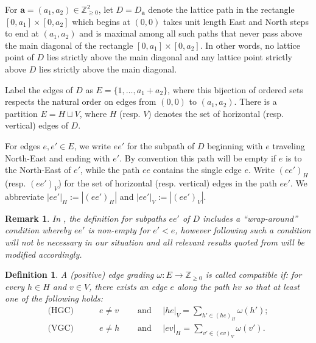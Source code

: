 \documentclass{amsart}
\newtheorem{definition}[theorem]{Definition}
\newtheorem{remark}[theorem]{Remark}
\newcommand{\bfa}{\mathbf{a}}
\newcommand{\ZZ}{\mathbb{Z}}
\begin{document}
For $\bfa=(a_1,a_2)\in\ZZ_{\ge0}^2$, let $D=D_\bfa$ denote the lattice path in the rectangle $[0,a_1]\times[0,a_2]$ which begins at $(0,0)$ takes unit length East and North steps to end at $(a_1,a_2)$ and is maximal among all such paths that never pass above the main diagonal of the rectangle $[0,a_1]\times[0,a_2]$.  In other words, no lattice point of $D$ lies strictly above the main diagonal and any lattice point strictly above $D$ lies strictly above the main diagonal.

Label the edges of $D$ as $E=\{1,\ldots,a_1+a_2\}$, where this bijection of ordered sets respects the natural order on edges from $(0,0)$ to $(a_1,a_2)$.  There is a partition $E=H\sqcup V$, where $H$ (resp. $V$) denotes the set of horizontal (resp. vertical) edges of $D$. 

For edges $e,e'\in E$, we write $ee'$ for the subpath of $D$ beginning with $e$ traveling North-East and ending with $e'$.  By convention this path will be empty if $e$ is to the North-East of $e'$, while the path $ee$ contains the single edge $e$.  Write $(ee')_H$ (resp. $(ee')_V$) for the set of horizontal (resp. vertical) edges in the path $ee'$.
We abbreviate $|ee'|_H:=|(ee')_H|$ and $|ee'|_V:=|(ee')_V|$.
\begin{remark}
 In \cite{rupel2}, the definition for subpaths $ee'$ of $D$ includes a ``wrap-around'' condition whereby $ee'$ is non-empty for $e'<e$, however following \cite[Remark 2.22]{rupel2} such a condition will not be necessary in our situation and all relevant results quoted from \cite{rupel2} will be modified accordingly.
\end{remark}

\begin{definition}\label{def:compatibility}
  A (\emph{positive}) \emph{edge grading} $\omega:E\to\ZZ_{\ge0}$ is called \emph{compatible} if: for every $h\in H$ and $v\in V$, there exists an edge $e$ along the path $hv$ so that at least one of the following holds:
  \begin{align*}
    \text{(HGC)}\quad\quad\quad e\ne v\quad&\text{ and }\quad |he|_V=\sum\limits_{h'\in(he)_H} \omega(h');\\
    \text{(VGC)}\quad\quad\quad e\ne h\quad&\text{ and }\quad |ev|_H=\sum\limits_{v'\in(ev)_V} \omega(v').
  \end{align*}
\end{definition}
\end{document}
